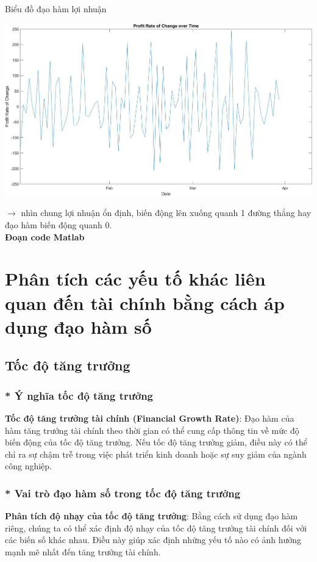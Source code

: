 \documentclass[12pt,a4paper]{report}
\begin{document}
Biểu đồ đạo hàm lợi nhuận
\begin{center}
    \includegraphics[scale = 0.25]{fig2.png}
\end{center}
$\rightarrow$ nhìn chung lợi nhuận ổn định, biến động lên xuống quanh 1 đường thẳng hay đạo hàm biến động quanh 0.\\
\textbf{Đoạn code Matlab}

\section{Phân tích các yếu tố khác liên quan đến tài chính bằng cách áp dụng đạo hàm số}
\subsection{Tốc độ tăng trưởng}
\subsubsection{* Ý nghĩa tốc độ tăng trưởng}
\textbf{Tốc độ tăng trưởng tài chính (Financial Growth Rate)}: Đạo hàm của hàm tăng trưởng tài chính theo thời gian có thể cung cấp thông tin về mức độ biến động của tốc độ tăng trưởng. Nếu tốc độ tăng trưởng giảm, điều này có thể chỉ ra sự chậm trễ trong việc phát triển kinh doanh hoặc sự suy giảm của ngành công nghiệp.
\subsubsection{* Vai trò đạo hàm số trong tốc độ tăng trưởng}
\textbf{Phân tích độ nhạy của tốc độ tăng trưởng}: Bằng cách sử dụng đạo hàm riêng, chúng ta có thể xác định độ nhạy của tốc độ tăng trưởng tài chính đối với các biến số khác nhau. Điều này giúp xác định những yếu tố nào có ảnh hưởng mạnh mẽ nhất đến tăng trưởng tài chính.
\end{document}
